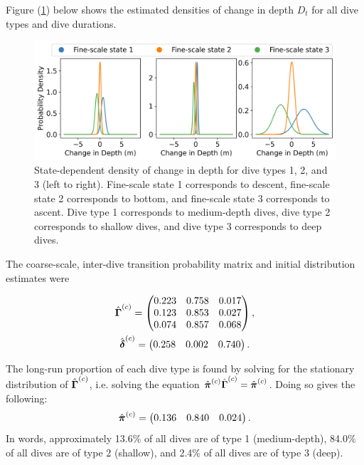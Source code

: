 \documentclass[12pt]{article}
\begin{document}
Figure (\ref{fig:emission_dist}) below shows the estimated densities of change in depth $D_t$ for all dive types and dive durations.

\begin{figure}[H]
    \centering
    \includegraphics[width=6.5in]{../plt/emission_dists_K_3_3_nWhales_8.png}
    \caption{State-dependent density of change in depth for dive types 1, 2, and 3 (left to right). Fine-scale state 1 corresponds to descent, fine-scale state 2 corresponds to bottom, and fine-scale state 3 corresponds to ascent. Dive type 1 corresponds to medium-depth dives, dive type 2 corresponds to shallow dives, and dive type 3 corresponds to deep dives.}
    \label{fig:emission_dist}
\end{figure}

The coarse-scale, inter-dive transition probability matrix and initial distribution estimates were 

\begin{gather}
    \hat {\boldsymbol{\Gamma}}^{(c)} = 
    \begin{pmatrix} 
    0.223 & 0.758 & 0.017 \\
    0.123 & 0.853 & 0.027 \\
    0.074 & 0.857 & 0.068
    \end{pmatrix}, \\
    \hat {\boldsymbol{\delta}}^{(c)} = \begin{pmatrix} 0.258 & 0.002 & 0.740 \end{pmatrix}.
\end{gather}

The long-run proportion of each dive type is found by solving for the stationary distribution of $\hat {\boldsymbol{\Gamma}}^{(c)}$, i.e. solving the equation $\hat {\boldsymbol{\pi}}^{(c)} \hat {\boldsymbol{\Gamma}}^{(c)} = \hat {\boldsymbol{\pi}}^{(c)}$. Doing so gives the following:
%
\begin{equation}
    \hat {\boldsymbol{\pi}}^{(c)} = 
    \begin{pmatrix}
        0.136 & 0.840 & 0.024
    \end{pmatrix}.
\end{equation}
%
In words, approximately 13.6\% of all dives are of type 1 (medium-depth), 84.0\% of all dives are of type 2 (shallow), and 2.4\% of all dives are of type 3 (deep).
\end{document}
